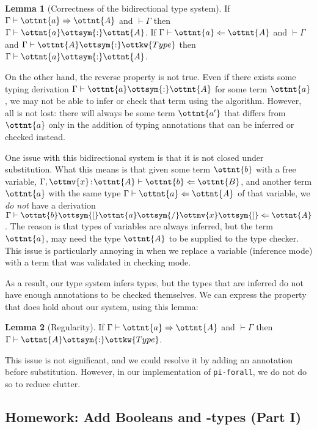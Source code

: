 \documentclass{article}
\def\({}%
\def\){}%
\newcommand\pif{\texttt{pi-forall}\xspace}
\theoremstyle{definition}
\newtheorem{lemma}{Lemma}[section]
\begin{document}
\begin{lemma}[Correctness of the bidirectional type system]
If $\Gamma  \vdash  \ottnt{a}  \Rightarrow  \ottnt{A}$ and $\vdash  \Gamma$ then $\Gamma  \vdash  \ottnt{a}  \ottsym{:}  \ottnt{A}$.
If $\Gamma  \vdash  \ottnt{a}  \Leftarrow  \ottnt{A}$ and $\vdash  \Gamma$ and $\Gamma  \vdash  \ottnt{A}  \ottsym{:}  \ottkw{Type}$ then $\Gamma  \vdash  \ottnt{a}  \ottsym{:}  \ottnt{A}$.
\end{lemma}

On the other hand, the reverse property is not true. Even if there exists some
typing derivation $\Gamma  \vdash  \ottnt{a}  \ottsym{:}  \ottnt{A}$ for some term $\ottnt{a}$, we may not be able
to infer or check that term using the algorithm. However, all is not lost:
there will always be some term $\ottnt{a'}$ that differs from $\ottnt{a}$ only in the
addition of typing annotations that can be inferred or checked instead.

One issue with this bidirectional system is that it is not closed under
substitution.  What this means is that given some term $\ottnt{b}$ with a free
variable, $ \Gamma ,  \ottmv{x} \! :\! \ottnt{A}   \vdash  \ottnt{b}  \Leftarrow  \ottnt{B}$, and another term $\ottnt{a}$ with the same
type $\Gamma  \vdash  \ottnt{a}  \Leftarrow  \ottnt{A}$ of that variable, we \emph{do not} have a derivation
$\Gamma  \vdash  \ottnt{b}  \ottsym{[}  \ottnt{a}  \ottsym{/}  \ottmv{x}  \ottsym{]}  \Leftarrow  \ottnt{A}$. The reason is that types of variables are always
inferred, but the term $\ottnt{a}$, may need the type $\ottnt{A}$ to be supplied to
the type checker.  This issue is particularly annoying in  when we
replace a variable (inference mode) with a term that was validated in checking
mode.

As a result, our type system infers types, but the types that are inferred do
not have enough annotations to be checked themselves. We can express the property
that does hold about our system, using this lemma:

\begin{lemma}[Regularity]
If $\Gamma  \vdash  \ottnt{a}  \Rightarrow  \ottnt{A}$ and $\vdash  \Gamma$ then $\Gamma  \vdash  \ottnt{A}  \ottsym{:}  \ottkw{Type}$.
\end{lemma}

This issue is not significant, and we could resolve it by adding an annotation
before substitution. However, in our implementation of \pif, we do not do so
to reduce clutter.

\subsection{Homework:  Add Booleans and
\(\Sigma\)-types (Part I)}
\end{document}
